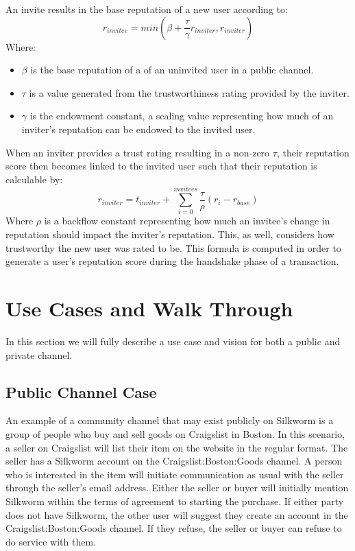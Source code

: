 \documentclass[letterpaper,twocolumn,10pt]{article}
\begin{document}
An invite results in the base reputation of a new user according to:
\[r_{invitee} = min(\beta + \frac{\tau}{\gamma} r_{inviter}, r_{inviter})\]
Where:
\begin{itemize}
    \item $\beta$ is the base reputation of a of an uninvited user in a public channel.
    \item $\tau$ is a value generated from the trustworthiness rating provided by the inviter.
    \item $\gamma$ is the endowment constant, a scaling value representing how much of an inviter's reputation can be endowed to the invited user.
\end{itemize}
When an inviter provides a trust rating resulting in a non-zero $\tau$, their reputation score then becomes linked to the invited user such that their reputation is calculable by:
\[ r_{inviter} = t_{inviter} + \sum_{i = 0}^{invitees} \frac{\tau}{\rho}(r_{i} - r_{base}) \]
Where $\rho$ is a backflow constant representing how much an invitee's change in reputation should impact the inviter's reputation. This, as well, considers how trustworthy the new user was rated to be.  This formula is computed in order to generate a user's reputation score during the handshake phase of a transaction.

\section{Use Cases and Walk Through}
In this section we will fully describe a use case and vision for both a public and private channel.

\subsection{Public Channel Case}
An example of a community channel that may exist publicly on Silkworm is a group of people who buy and sell goods on Craigslist in Boston. In this scenario, a seller on Craigslist will list their item on the website in the regular format. The seller has a Silkworm account on the Craigslist:Boston:Goods channel. A person who is interested in the item will initiate communication as usual with the seller through the seller's email address. Either the seller or buyer will initially mention Silkworm within the terms of agreement to starting the purchase. If either party does not have Silkworm, the other user will suggest they create an account in the Craigslist:Boston:Goods channel. If they refuse, the seller or buyer can refuse to do service with them. 
\end{document}
